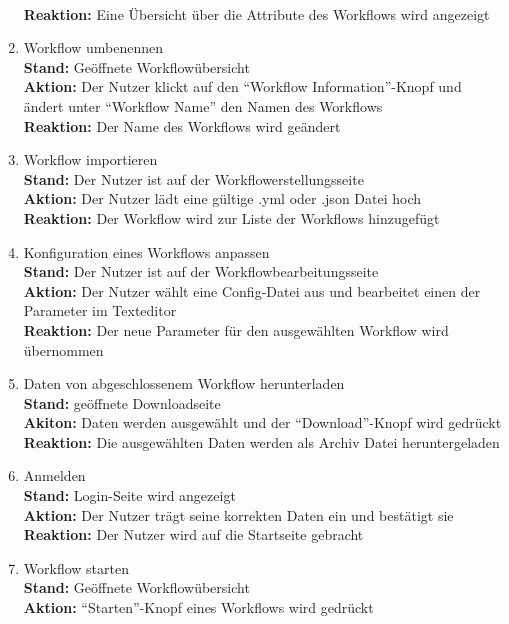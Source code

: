 \begin{enumerate}
        \\ \textbf{Reaktion:} Eine Übersicht über die Attribute des Workflows wird angezeigt
    \item Workflow umbenennen
        \\ \textbf{Stand:} Geöffnete Workflowübersicht
        \\ \textbf{Aktion:} Der \gls{Nutzer} klickt auf den \enquote{Workflow Information}-Knopf und ändert unter \enquote{Workflow Name} den Namen des Workflows
        \\ \textbf{Reaktion:} Der Name des Workflows wird geändert
    \item Workflow importieren
        \\ \textbf{Stand:} Der \gls{Nutzer} ist auf der Workflowerstellungsseite 
        \\ \textbf{Aktion:} Der \gls{Nutzer} lädt eine gültige .yml oder .json Datei hoch 
        \\ \textbf{Reaktion:} Der Workflow wird zur Liste der Workflows hinzugefügt
    \item Konfiguration eines Workflows anpassen
        \\ \textbf{Stand:} Der \gls{Nutzer} ist auf der Workflowbearbeitungsseite
        \\ \textbf{Aktion:} Der \gls{Nutzer} wählt eine Config-Datei aus und bearbeitet einen der Parameter im Texteditor
        \\ \textbf{Reaktion:} Der neue Parameter für den ausgewählten Workflow wird übernommen
    \item Daten von abgeschlossenem Workflow herunterladen
        \\ \textbf{Stand:} geöffnete Downloadseite
        \\ \textbf{Akiton:} Daten werden ausgewählt und der \enquote{Download}-Knopf wird gedrückt
        \\ \textbf{Reaktion:} Die ausgewählten Daten werden als Archiv Datei heruntergeladen
    \item Anmelden
        \\ \textbf{Stand:} Login-Seite wird angezeigt
        \\ \textbf{Aktion:} Der \gls{Nutzer} trägt seine korrekten Daten ein und bestätigt sie
        \\ \textbf{Reaktion:} Der \gls{Nutzer} wird auf die Startseite gebracht
    \item Workflow starten
        \\ \textbf{Stand:} Geöffnete Workflowübersicht 
        \\ \textbf{Aktion:} \enquote{Starten}-Knopf eines Workflows wird gedrückt

\end{enumerate}
